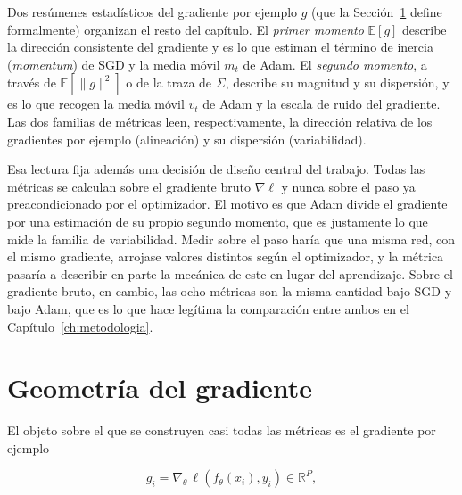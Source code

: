 Dos resúmenes estadísticos del gradiente por ejemplo $g$ (que la Sección~\ref{sec:geometria} define formalmente) organizan el resto del capítulo. El \emph{primer momento} $\mathbb{E}[g]$ describe la dirección consistente del gradiente y es lo que estiman el término de inercia (\emph{momentum}) de SGD y la media móvil $m_t$ de Adam. El \emph{segundo momento}, a través de $\mathbb{E}[\|g\|^2]$ o de la traza de $\Sigma$, describe su magnitud y su dispersión, y es lo que recogen la media móvil $v_t$ de Adam y la escala de ruido del gradiente. Las dos familias de métricas leen, respectivamente, la dirección relativa de los gradientes por ejemplo (alineación) y su dispersión (variabilidad).

Esa lectura fija además una decisión de diseño central del trabajo. Todas las métricas se calculan sobre el gradiente bruto $\nabla \ell$ y nunca sobre el paso ya preacondicionado por el optimizador. El motivo es que Adam divide el gradiente por una estimación de su propio segundo momento, que es justamente lo que mide la familia de variabilidad. Medir sobre el paso haría que una misma red, con el mismo gradiente, arrojase valores distintos según el optimizador, y la métrica pasaría a describir en parte la mecánica de este en lugar del aprendizaje. Sobre el gradiente bruto, en cambio, las ocho métricas son la misma cantidad bajo SGD y bajo Adam, que es lo que hace legítima la comparación entre ambos en el Capítulo~\ref{ch:metodologia}.

\section{Geometría del gradiente}
\label{sec:geometria}

El objeto sobre el que se construyen casi todas las métricas es el gradiente por ejemplo

\begin{equation}
g_i = \nabla_\theta\, \ell(f_\theta(x_i), y_i) \in \mathbb{R}^P,
\label{eq:per-sample}
\end{equation}

